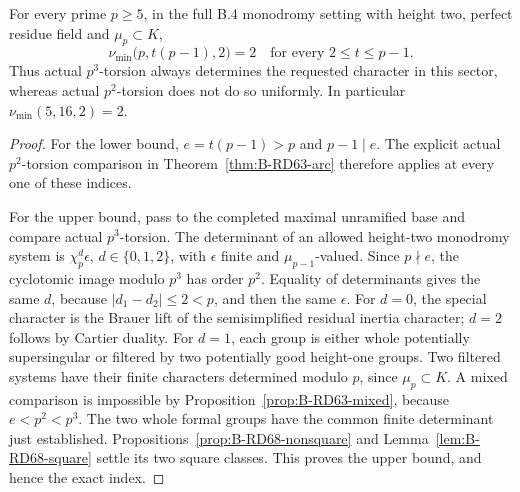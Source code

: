 \begin{theorem}
\label{thm:B-RD68}
For every prime \(p\ge5\), in the full B.4 monodromy setting
with height two, perfect residue field and \(\mu_p\subset K\),
\[
 \boxed{\displaystyle
 \nu_{\min}\bigl(p,t(p-1),2\bigr)=2
 \quad\text{for every }2\le t\le p-1.}
 \tag{B-RD68.12}
\]
Thus actual \(p^3\)-torsion always determines the requested
character in this sector, whereas actual \(p^2\)-torsion
does not do so uniformly. In particular
\(\nu_{\min}(5,16,2)=2\).
\end{theorem}
\begin{proof}
For the lower bound, \(e=t(p-1)>p\) and \(p-1\mid e\).
The explicit actual \(p^2\)-torsion comparison in
Theorem~\ref{thm:B-RD63-arc} therefore applies at every
one of these indices.

For the upper bound, pass to the completed maximal unramified
base and compare actual \(p^3\)-torsion. The determinant of
an allowed height-two monodromy system is
\(\chi_p^d\epsilon\), \(d\in\{0,1,2\}\), with \(\epsilon\)
finite and \(\mu_{p-1}\)-valued. Since \(p\nmid e\), the
cyclotomic image modulo \(p^3\) has order \(p^2\).
Equality of determinants gives the same \(d\), because
\(|d_1-d_2|\le2<p\), and then the same \(\epsilon\).
For \(d=0\), the special character is the Brauer lift of the
semisimplified residual inertia character; \(d=2\) follows
by Cartier duality. For \(d=1\), each group is either whole
potentially supersingular or filtered by two potentially good
height-one groups. Two filtered systems have their finite
characters determined modulo \(p\), since \(\mu_p\subset K\).
A mixed comparison is impossible by
Proposition~\ref{prop:B-RD63-mixed}, because \(e<p^2<p^3\).
The two whole formal groups have the common finite determinant
just established. Propositions~\ref{prop:B-RD68-nonsquare}
and Lemma~\ref{lem:B-RD68-square} settle its two square classes.
This proves the upper bound, and hence the exact index.
\end{proof}

